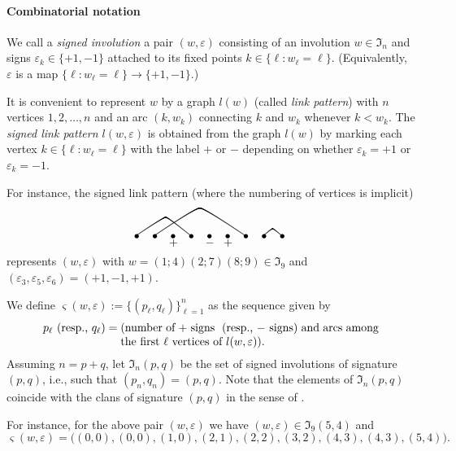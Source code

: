 \documentclass{amsart}
\theoremstyle{definition}
\newcommand{\courbe}[7]{\qbezier(#1,#3)(#4,#7)(#5,#7)
\qbezier(#5,#7)(#6,#7)(#2,#3)}
\begin{document}
\medskip

\paragraph{\bf Combinatorial notation}
We call a {\em signed involution} a pair $(w,\varepsilon)$ consisting of
an involution $w\in\mathfrak{I}_n$ and signs
$\varepsilon_k\in\{+1,-1\}$ attached to its fixed points
$k\in\{\ell:w_\ell=\ell\}$.
(Equivalently, $\varepsilon$ is a map $\{\ell:w_\ell=\ell\}\to\{+1,-1\}$.)

It is convenient to represent $w$ by a graph $l(w)$ (called {\em link pattern}) with $n$ vertices
$1,2,\ldots,n$ and an arc $(k,w_k)$ connecting $k$ and $w_k$ whenever $k<w_k$.
The {\em signed link pattern $l(w,\varepsilon)$} is
obtained from the graph $l(w)$ by marking each vertex
$k\in\{\ell:w_\ell=\ell\}$ with the label $+$ or $-$ depending on
whether $\varepsilon_k=+1$ or $\varepsilon_k=-1$.

For instance, the signed link pattern (where the numbering of vertices is implicit)
\[
\begin{picture}(140,30)(-20,-5)
\courbe{-16}{32}{0}{8}{10}{12}{16} \courbe{0}{80}{0}{36}{40}{44}{24}
\courbe{96}{112}{0}{103}{104}{105}{6} \put(-18,-3){$\bullet$}
\put(-2,-3){$\bullet$} \put(14,-3){$\bullet$} \put(13,-9){$+$}
\put(30,-3){$\bullet$} \put(46,-3){$\bullet$} \put(45,-9){$-$}
\put(62,-3){$\bullet$} \put(61,-9){$+$} \put(78,-3){$\bullet$}
\put(94,-3){$\bullet$} \put(110,-3){$\bullet$}
\end{picture}
\]
represents $(w,\varepsilon)$ with
$w=(1;4)(2;7)(8;9)\in\mathfrak{I}_9$ and
$(\varepsilon_3,\varepsilon_5,\varepsilon_6)=(+1,-1,+1)$.

We define $\varsigma(w,\varepsilon):=\{(p_\ell,q_\ell)\}_{\ell=1}^n$
as the sequence given by
\[
p_\ell\mbox{ (resp., $q_\ell$)}=\parbox[t]{8cm}{(number of $+$ signs
\mbox{ (resp., $-$ signs)} and arcs among the first $\ell$ vertices of
$l(w,\varepsilon)$).}
\]
Assuming $n=p+q$, let $\mathfrak{I}_n(p,q)$ be the set of
signed involutions of signature $(p,q)$, i.e., such that $(p_n,q_n)=(p,q)$.
Note that the elements of $\mathfrak{I}_n(p,q)$ coincide with the clans of signature $(p,q)$
in the sense of \cite{MO,Y}.

For instance, for the above pair
$(w,\varepsilon)$ we have
$(w,\varepsilon)\in\mathfrak{I}_9(5,4)$ and
\[
\varsigma(w,\varepsilon)=\big((0,0),(0,0),(1,0),(2,1),(2,2),(3,2),(4,3),(4,3),(5,4)\big).
\]
\end{document}
